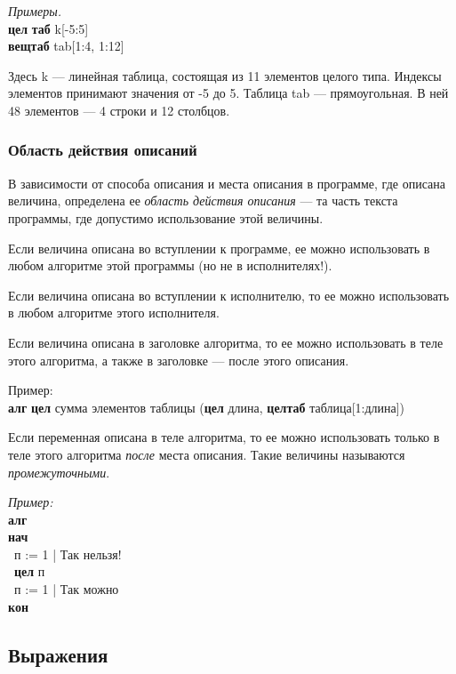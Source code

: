 \documentclass[12pt,a4paper]{article}
\newcommand{\otstup}{\textperiodcentered\ }
\begin{document}
\emph{Примеры.}\\
{\sffamily
	\textbf{цел} \textbf{таб} k[-5:5]\\
        \textbf{вещтаб} tab[1:4, 1:12]
}

	Здесь \textsf{k} --- линейная таблица, состоящая из 11 элементов целого типа. Индексы элементов принимают значения от -5 до 5. Таблица \textsf{tab} --- прямоугольная. В ней 48 элементов --- 4 строки и 12 столбцов.

\subsubsection{Область действия описаний}

	В зависимости от  способа описания и места описания в программе, где описана величина, определена ее \emph{область действия описания} --- та часть текста программы, где допустимо использование этой величины. 

	Если величина описана во вступлении к программе, ее можно использовать в любом алгоритме этой программы (но не в исполнителях!).

	Если величина описана во вступлении к исполнителю, то ее можно использовать в любом алгоритме этого исполнителя. 

	Если величина описана в заголовке алгоритма, то ее можно использовать в теле этого алгоритма, а также в заголовке --- после этого описания.

	Пример:\\
\textsf{\textbf{алг} \textbf{цел} сумма элементов таблицы (\textbf{цел} длина, \textbf{целтаб} таблица[1:длина])}

	Если переменная описана в теле алгоритма, то ее можно использовать только в теле этого алгоритма \emph{после} места описания.  Такие величины называются \emph{промежуточными}.

\emph{Пример:}\\
{\sffamily
\textbf{алг}\\
\textbf{нач}\\
\otstup п := 1    |   Так нельзя!\\
\otstup \textbf{цел} п\\
\otstup п := 1    | Так можно\\
\textbf{кон}
}

\subsection{Выражения}
\label{expressions}
\end{document}

